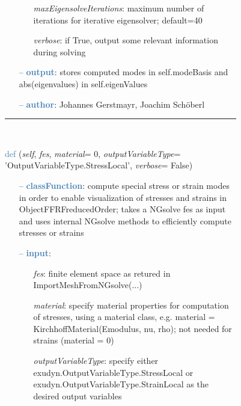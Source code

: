 \begin{itemize}[leftmargin=1.4cm]
\begin{itemize}[leftmargin=0.5cm]
\begin{itemize}[leftmargin=1.4cm]
\begin{itemize}[leftmargin=1.4cm]
\begin{itemize}[leftmargin=0.5cm]
\begin{itemize}[leftmargin=0.7cm]
\begin{itemize}[leftmargin=1.2cm]
    \item[] {\it   maxEigensolveIterations}: maximum number of iterations for iterative eigensolver; default=40
    \item[] {\it   verbose}: if True, output some relevant information during solving
  \end{itemize}
  \item[--]  \textcolor{steelblue}{\bf output}: stores computed modes in self.modeBasis and abs(eigenvalues) in self.eigenValues  \item[--]  \textcolor{steelblue}{\bf author}: Johannes Gerstmayr, Joachim Sch\"oberl\vspace{12pt}\end{itemize}
%
\noindent\rule{8cm}{0.75pt}\vspace{1pt} \\ 
\begin{flushleft}
\noindent \textcolor{steelblue}{def {\bf {}}}\label{sec:FEM:FEMinterface:ComputePostProcessingModesNGsolve}
({\it self}, {\it fes}, {\it material}= 0, {\it outputVariableType}= 'OutputVariableType.StressLocal', {\it verbose}= False)
\end{flushleft}
\setlength{\itemindent}{0.7cm}
\begin{itemize}[leftmargin=0.7cm]
  \item[--]  \textcolor{steelblue}{\bf classFunction}: compute special stress or strain modes in order to enable visualization of stresses and strains in ObjectFFRFreducedOrder; takes a NGsolve fes as input and uses internal NGsolve methods to efficiently compute stresses or strains  \item[--]  \textcolor{steelblue}{\bf input}: \vspace{-6pt}
  \begin{itemize}[leftmargin=1.2cm]
\setlength{\itemindent}{-0.7cm}
    \item[] {\it fes}: finite element space as retured in ImportMeshFromNGsolve(...)
    \item[] {\it   material}: specify material properties for computation of stresses, using a material class, e.g. material = KirchhoffMaterial(Emodulus, nu, rho); not needed for strains (material = 0)
    \item[] {\it   outputVariableType}: specify either exudyn.OutputVariableType.StressLocal or exudyn.OutputVariableType.StrainLocal as the desired output variables
  \end{itemize}

\end{itemize}
\end{itemize}
\end{itemize}
\end{itemize}
\end{itemize}
\end{itemize}
